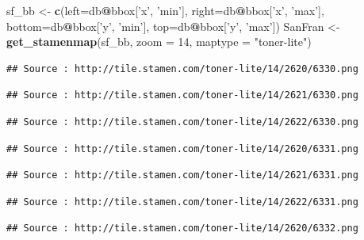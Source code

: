 \documentclass[
]{book}
\newenvironment{Shaded}{\begin{snugshade}}{\end{snugshade}}
\newcommand{\DataTypeTok}[1]{\textcolor[rgb]{0.13,0.29,0.53}{#1}}
\newcommand{\DecValTok}[1]{\textcolor[rgb]{0.00,0.00,0.81}{#1}}
\newcommand{\KeywordTok}[1]{\textcolor[rgb]{0.13,0.29,0.53}{\textbf{#1}}}
\newcommand{\NormalTok}[1]{#1}
\newcommand{\OperatorTok}[1]{\textcolor[rgb]{0.81,0.36,0.00}{\textbf{#1}}}
\newcommand{\StringTok}[1]{\textcolor[rgb]{0.31,0.60,0.02}{#1}}
\begin{document}
\begin{Shaded}
\begin{Highlighting}[]
\NormalTok{sf_bb <-}\StringTok{ }\KeywordTok{c}\NormalTok{(}\DataTypeTok{left=}\NormalTok{db}\OperatorTok{@}\NormalTok{bbox[}\StringTok{'x'}\NormalTok{, }\StringTok{'min'}\NormalTok{],}
           \DataTypeTok{right=}\NormalTok{db}\OperatorTok{@}\NormalTok{bbox[}\StringTok{'x'}\NormalTok{, }\StringTok{'max'}\NormalTok{],}
           \DataTypeTok{bottom=}\NormalTok{db}\OperatorTok{@}\NormalTok{bbox[}\StringTok{'y'}\NormalTok{, }\StringTok{'min'}\NormalTok{],}
           \DataTypeTok{top=}\NormalTok{db}\OperatorTok{@}\NormalTok{bbox[}\StringTok{'y'}\NormalTok{, }\StringTok{'max'}\NormalTok{])}
\NormalTok{SanFran <-}\StringTok{ }\KeywordTok{get_stamenmap}\NormalTok{(sf_bb, }
                         \DataTypeTok{zoom =} \DecValTok{14}\NormalTok{, }
                         \DataTypeTok{maptype =} \StringTok{"toner-lite"}\NormalTok{)}
\end{Highlighting}
\end{Shaded}

\begin{verbatim}
## Source : http://tile.stamen.com/toner-lite/14/2620/6330.png
\end{verbatim}

\begin{verbatim}
## Source : http://tile.stamen.com/toner-lite/14/2621/6330.png
\end{verbatim}

\begin{verbatim}
## Source : http://tile.stamen.com/toner-lite/14/2622/6330.png
\end{verbatim}

\begin{verbatim}
## Source : http://tile.stamen.com/toner-lite/14/2620/6331.png
\end{verbatim}

\begin{verbatim}
## Source : http://tile.stamen.com/toner-lite/14/2621/6331.png
\end{verbatim}

\begin{verbatim}
## Source : http://tile.stamen.com/toner-lite/14/2622/6331.png
\end{verbatim}

\begin{verbatim}
## Source : http://tile.stamen.com/toner-lite/14/2620/6332.png
\end{verbatim}
\end{document}
